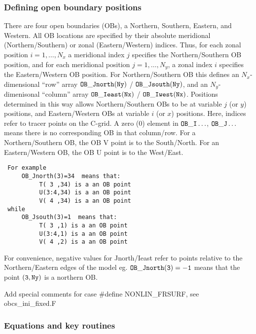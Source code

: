 
\subsubsection{Defining open boundary positions
\label{sec:pkg:obcs:defining}}

There are four open boundaries (OBs), a 
Northern, Southern, Eastern, and Western.
All OB locations are specified by their absolute
meridional (Northern/Southern) or zonal (Eastern/Western) indices.
Thus, for each zonal position $i=1,\ldots,N_x$ a meridional index
$j$ specifies the Northern/Southern OB position,
and for each meridional position $j=1,\ldots,N_y$, a zonal index
$i$ specifies the Eastern/Western OB position.
For Northern/Southern OB this defines an $N_x$-dimensional
``row'' array $\tt OB\_Jnorth(Ny)$ / $\tt OB\_Jsouth(Ny)$,
and an $N_y$-dimenisonal 
``column'' array $\tt OB\_Ieast(Nx)$ / $\tt OB\_Iwest(Nx)$.
Positions determined in this way allows Northern/Southern
OBs to be at variable $j$ (or $y$) positions, and Eastern/Western
OBs at variable $i$ (or $x$) positions.
Here, indices refer to tracer points on the C-grid.
A zero (0) element in $\tt OB\_I\ldots$, $\tt OB\_J\ldots$
means there is no corresponding OB in that column/row.
For a Northern/Southern OB, the OB V point is to the South/North.
For an Eastern/Western OB, the OB U point is to the West/East.

\begin{verbatim}
 For example
     OB_Jnorth(3)=34  means that:
          T( 3 ,34) is a an OB point
          U(3:4,34) is a an OB point
          V( 4 ,34) is a an OB point
 while
     OB_Jsouth(3)=1  means that:
          T( 3 ,1) is a an OB point
          U(3:4,1) is a an OB point
          V( 4 ,2) is a an OB point
\end{verbatim}

For convenience, negative values for Jnorth/Ieast refer to
points relative to the Northern/Eastern edges of the model
eg. $\tt OB\_Jnorth(3)=-1$  means that the point $\tt (3,Ny)$ 
is a northern OB.

\noindent
\textsf{Add special comments for case \#define NONLIN\_FRSURF,
see obcs\_ini\_fixed.F}


\subsubsection{Equations and key routines
\label{sec:pkg:obcs:equations}}

